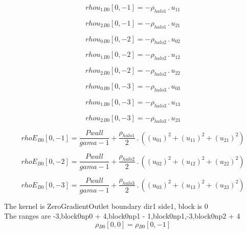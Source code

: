 \documentclass{article}
\begin{document}
\begin{dmath}{rhou_{1}{_{B0}}}[{0,-1}] = - \rho_{halo 1} \,.\, u_{11}\end{dmath}

\begin{dmath}{rhou_{2}{_{B0}}}[{0,-1}] = - \rho_{halo 1} \,.\, u_{21}\end{dmath}

\begin{dmath}{rhou_{0}{_{B0}}}[{0,-2}] = - \rho_{halo 2} \,.\, u_{02}\end{dmath}

\begin{dmath}{rhou_{1}{_{B0}}}[{0,-2}] = - \rho_{halo 2} \,.\, u_{12}\end{dmath}

\begin{dmath}{rhou_{2}{_{B0}}}[{0,-2}] = - \rho_{halo 2} \,.\, u_{22}\end{dmath}

\begin{dmath}{rhou_{0}{_{B0}}}[{0,-3}] = - \rho_{halo 3} \,.\, u_{03}\end{dmath}

\begin{dmath}{rhou_{1}{_{B0}}}[{0,-3}] = - \rho_{halo 3} \,.\, u_{13}\end{dmath}

\begin{dmath}{rhou_{2}{_{B0}}}[{0,-3}] = - \rho_{halo 3} \,.\, u_{23}\end{dmath}

\begin{dmath}{rhoE{_{B0}}}[{0,-1}] = \frac{Pwall}{gama - 1} + \frac{\rho_{halo 1}}{2} \,.\, \left(\left(u_{01} \right)^{2} + \left(u_{11} \right)^{2} + \left(u_{21} \right)^{2}\right)\end{dmath}

\begin{dmath}{rhoE{_{B0}}}[{0,-2}] = \frac{Pwall}{gama - 1} + \frac{\rho_{halo 2}}{2} \,.\, \left(\left(u_{02} \right)^{2} + \left(u_{12} \right)^{2} + \left(u_{22} \right)^{2}\right)\end{dmath}

\begin{dmath}{rhoE{_{B0}}}[{0,-3}] = \frac{Pwall}{gama - 1} + \frac{\rho_{halo 3}}{2} \,.\, \left(\left(u_{03} \right)^{2} + \left(u_{13} \right)^{2} + \left(u_{23} \right)^{2}\right)\end{dmath}

\noindent The kernel is ZeroGradientOutlet boundary dir1 side1, block is 0\\\noindent The ranges are -3,block0np0 + 4,block0np1 - 1,block0np1,-3,block0np2 + 4\\\begin{dmath}{\rho{_{B0}}}[{0,0}] = {\rho{_{B0}}}[{0,-1}]\end{dmath}
\end{document}
